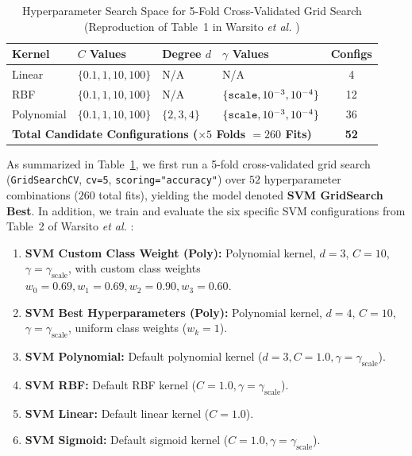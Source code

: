 \documentclass[conference]{IEEEtran}
\begin{document}
\begin{table}[t]
\centering
\caption{Hyperparameter Search Space for 5-Fold Cross-Validated Grid Search (Reproduction of Table~1 in Warsito \emph{et al.} \cite{warsito2026lightweight})}
\label{tab:grid_space}
\begin{tabular}{llllc}
\toprule
\textbf{Kernel} & \textbf{$C$ Values} & \textbf{Degree $d$} & \textbf{$\gamma$ Values} & \textbf{Configs} \\
\midrule
Linear     & $\{0.1, 1, 10, 100\}$ & N/A         & N/A                                 &  4 \\
RBF        & $\{0.1, 1, 10, 100\}$ & N/A         & $\{\text{\texttt{scale}}, 10^{-3}, 10^{-4}\}$ & 12 \\
Polynomial & $\{0.1, 1, 10, 100\}$ & $\{2, 3, 4\}$ & $\{\text{\texttt{scale}}, 10^{-3}, 10^{-4}\}$ & 36 \\
\midrule
\multicolumn{4}{l}{\textbf{Total Candidate Configurations ($\times 5$ Folds $= 260$ Fits)}} & \textbf{52} \\
\bottomrule
\end{tabular}
\end{table}

As summarized in Table~\ref{tab:grid_space}, we first run a 5-fold cross-validated grid search (\texttt{GridSearchCV}, \texttt{cv=5}, \texttt{scoring="accuracy"}) over $52$ hyperparameter combinations ($260$ total fits), yielding the model denoted \textbf{SVM GridSearch Best}. In addition, we train and evaluate the six specific SVM configurations from Table~2 of Warsito \emph{et al.} \cite{warsito2026lightweight}:
\begin{enumerate}
    \item \textbf{SVM Custom Class Weight (Poly):} Polynomial kernel, $d=3$, $C=10$, $\gamma=\gamma_{\text{scale}}$, with custom class weights $w_0=0.69, w_1=0.69, w_2=0.90, w_3=0.60$.
    \item \textbf{SVM Best Hyperparameters (Poly):} Polynomial kernel, $d=4$, $C=10$, $\gamma=\gamma_{\text{scale}}$, uniform class weights ($w_k=1$).
    \item \textbf{SVM Polynomial:} Default polynomial kernel ($d=3, C=1.0, \gamma=\gamma_{\text{scale}}$).
    \item \textbf{SVM RBF:} Default RBF kernel ($C=1.0, \gamma=\gamma_{\text{scale}}$).
    \item \textbf{SVM Linear:} Default linear kernel ($C=1.0$).
    \item \textbf{SVM Sigmoid:} Default sigmoid kernel ($C=1.0, \gamma=\gamma_{\text{scale}}$).
\end{enumerate}
\end{document}
